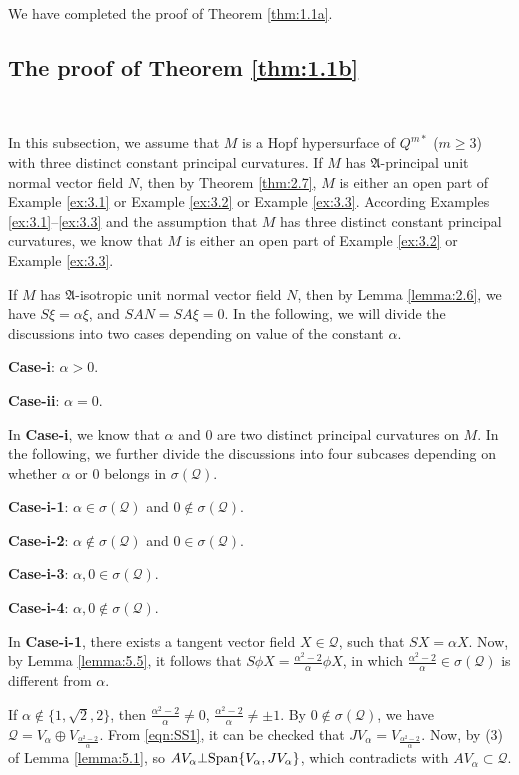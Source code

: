 \documentclass[reqno]{amsart}%
\theoremstyle{definition}
\numberwithin{equation}{section}
\begin{document}
We have completed the proof of Theorem \ref{thm:1.1a}.


\subsection{The proof of  Theorem \ref{thm:1.1b}}\label{sect:5.2}~

In this subsection, we assume that $M$ is a Hopf hypersurface of $Q^{m*}$ ($m\geq3$) with three distinct constant principal curvatures. 
If $M$ has $\mathfrak{A}$-principal unit normal vector field $N$, then by Theorem \ref{thm:2.7}, $M$ is either an open part of Example \ref{ex:3.1} or Example \ref{ex:3.2} or Example \ref{ex:3.3}. According Examples \ref{ex:3.1}--\ref{ex:3.3} and the assumption
that $M$ has three distinct constant principal curvatures, we
know that $M$ is either an open part of Example \ref{ex:3.2} or Example \ref{ex:3.3}.

If $M$ has $\mathfrak{A}$-isotropic unit normal vector field $N$, then by Lemma \ref{lemma:2.6}, we have $S\xi=\alpha\xi$, and $SAN=SA\xi=0$. In the following, we will divide the discussions into two cases depending on value of the constant $\alpha$.

{\bf Case-i}: $\alpha>0$.

{\bf Case-ii}: $\alpha=0$.


In {\bf Case-i}, we know that $\alpha$ and $0$ are two distinct principal curvatures on $M$.
In the following, we further divide the discussions into four subcases depending on whether $\alpha$ or $0$
belongs in $\sigma(\mathcal{Q})$.

{\bf Case-i-1}: $\alpha\in\sigma(\mathcal{Q})$ and $0\notin\sigma(\mathcal{Q})$.

{\bf Case-i-2}: $\alpha\notin\sigma(\mathcal{Q})$ and $0\in\sigma(\mathcal{Q})$.

{\bf Case-i-3}: $\alpha,0\in\sigma(\mathcal{Q})$.

{\bf Case-i-4}: $\alpha,0\notin\sigma(\mathcal{Q})$.

In {\bf Case-i-1}, there exists a tangent vector field $X\in\mathcal{Q}$, such that
$SX=\alpha X$. Now, by Lemma \ref{lemma:5.5}, it follows that $S\phi X=\tfrac{\alpha^2-2}{\alpha}\phi X$,
in which $\tfrac{\alpha^2-2}{\alpha}\in\sigma(\mathcal{Q})$ is different from $\alpha$.

If $\alpha\notin \{1,\sqrt{2},2\}$, then $\tfrac{\alpha^2-2}{\alpha}\neq0$, $\tfrac{\alpha^2-2}{\alpha}\neq\pm1$. By $0\notin\sigma(\mathcal{Q})$, we have $\mathcal{Q}=V_\alpha\oplus V_{\tfrac{\alpha^2-2}{\alpha}}$. From \eqref{eqn:SS1}, it can be checked
that $JV_\alpha=V_{\tfrac{\alpha^2-2}{\alpha}}$.
Now, by (3) of Lemma \ref{lemma:5.1}, so
$AV_\alpha\bot{\rm Span}\{V_\alpha,JV_\alpha\}$, which contradicts with $AV_\alpha\subset\mathcal{Q}$.
\end{document}

